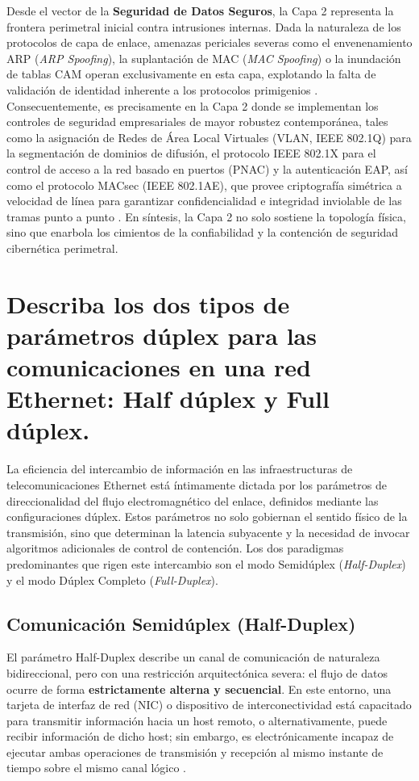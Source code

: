 \documentclass[a4paper,12pt]{article}
\begin{document}
Desde el vector de la \textbf{Seguridad de Datos Seguros}, la Capa 2 representa la frontera perimetral inicial contra intrusiones internas. Dada la naturaleza de los protocolos de capa de enlace, amenazas periciales severas como el envenenamiento ARP (\textit{ARP Spoofing}), la suplantación de MAC (\textit{MAC Spoofing}) o la inundación de tablas CAM operan exclusivamente en esta capa, explotando la falta de validación de identidad inherente a los protocolos primigenios \cite{kurose2017}. Consecuentemente, es precisamente en la Capa 2 donde se implementan los controles de seguridad empresariales de mayor robustez contemporánea, tales como la asignación de Redes de Área Local Virtuales (VLAN, IEEE 802.1Q) para la segmentación de dominios de difusión, el protocolo IEEE 802.1X para el control de acceso a la red basado en puertos (PNAC) y la autenticación EAP, así como el protocolo MACsec (IEEE 802.1AE), que provee criptografía simétrica a velocidad de línea para garantizar confidencialidad e integridad inviolable de las tramas punto a punto \cite{ieee8023}. En síntesis, la Capa 2 no solo sostiene la topología física, sino que enarbola los cimientos de la confiabilidad y la contención de seguridad cibernética perimetral.

\newpage

\section{Describa los dos tipos de parámetros dúplex para las comunicaciones en una red Ethernet: Half dúplex y Full dúplex.}

La eficiencia del intercambio de información en las infraestructuras de telecomunicaciones Ethernet está íntimamente dictada por los parámetros de direccionalidad del flujo electromagnético del enlace, definidos mediante las configuraciones dúplex. Estos parámetros no solo gobiernan el sentido físico de la transmisión, sino que determinan la latencia subyacente y la necesidad de invocar algoritmos adicionales de control de contención. Los dos paradigmas predominantes que rigen este intercambio son el modo Semidúplex (\textit{Half-Duplex}) y el modo Dúplex Completo (\textit{Full-Duplex}).

\subsection*{Comunicación Semidúplex (Half-Duplex)}

El parámetro Half-Duplex describe un canal de comunicación de naturaleza bidireccional, pero con una restricción arquitectónica severa: el flujo de datos ocurre de forma \textbf{estrictamente alterna y secuencial}. En este entorno, una tarjeta de interfaz de red (NIC) o dispositivo de interconectividad está capacitado para transmitir información hacia un host remoto, o alternativamente, puede recibir información de dicho host; sin embargo, es electrónicamente incapaz de ejecutar ambas operaciones de transmisión y recepción al mismo instante de tiempo sobre el mismo canal lógico \cite{stallings2014}.
\end{document}
